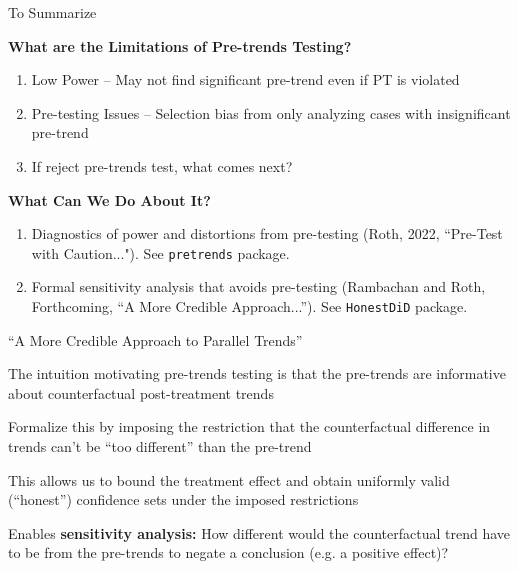 \documentclass[aspectratio = 169, 13pt]{beamer}
\begin{document}
\begin{frame}{To Summarize}
	
	\textbf{What are the Limitations of Pre-trends Testing?}
	\begin{enumerate}
		\item
		      Low Power -- May not find significant pre-trend even if PT is violated
		          
		\item
		      Pre-testing Issues -- Selection bias from only analyzing cases with insignificant pre-trend
		          
		\item
		      If reject pre-trends test, what comes next? 
	\end{enumerate}
	
	\bigskip
	\pause 
	
	\textbf{What Can We Do About It?}
	\begin{enumerate}
		\item 
		      Diagnostics of power and distortions from pre-testing (Roth, 2022, ``Pre-Test with Caution..."). See \texttt{pretrends} package. \hyperlink{power_analysis}{}
		          
		\item
		      Formal sensitivity analysis that avoids pre-testing (Rambachan and Roth, Forthcoming, ``A More Credible Approach...''). See \texttt{HonestDiD} package.
		          
	\end{enumerate}
	
\end{frame}




\begin{frame}{``A More Credible Approach to Parallel Trends''}
	\begin{wideitemize}
		
		
		\item The intuition motivating pre-trends testing is that the pre-trends are informative about counterfactual post-treatment trends
		
		\item Formalize this by imposing the restriction that the counterfactual difference in trends can't be ``too different'' than the pre-trend
		
		
		\item This allows us to bound the treatment effect and obtain uniformly valid (``honest'') confidence sets under the imposed restrictions
		    
		    
		\item Enables \textbf{sensitivity analysis:} How different would the counterfactual trend have to be from the pre-trends to negate a conclusion (e.g. a positive effect)?
		    
	\end{wideitemize}
	
\end{frame}
\end{document}
